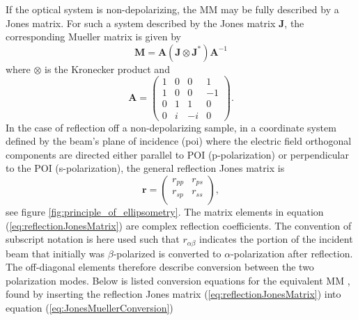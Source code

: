 If the optical system is non-depolarizing, the MM may be fully described by a Jones matrix. For such a system described by the Jones matrix $\mathbf{J}$, the corresponding Mueller matrix is given by \cite{hans_arwin}
\begin{equation}
    \mathbf{M} = \mathbf{A}(\mathbf{J}\otimes\mathbf{J}^*)\mathbf{A}^{-1}
    \label{eq:JonesMuellerConversion}
\end{equation}
where $\otimes$ is the Kronecker product and 
\begin{equation}
    \mathbf{A} = 
    \begin{pmatrix}
        1 & 0 & 0 & 1 \\
        1 & 0 & 0 & -1 \\
        0 & 1 & 1 & 0 \\
        0 & i & -i & 0
    \end{pmatrix}.
\end{equation}
In the case of reflection off a non-depolarizing sample, in a coordinate system defined by the beam's plane of incidence (\ac{poi}) where the electric field orthogonal components are directed either parallel to POI (p-polarization) or perpendicular to the POI (s-polarization), the general reflection Jones matrix is
\begin{equation}
    \mathbf{r} = 
    \begin{pmatrix}
        r_{pp}  &   r_{ps}  \\
        r_{sp}  &   r_{ss}  \\
    \end{pmatrix},
    \label{eq:reflectionJonesMatrix}
\end{equation}
see figure \ref{fig:principle_of_ellipsometry}. The matrix elements in equation (\ref{eq:reflectionJonesMatrix}) are complex reflection coefficients. The convention of subscript notation is here used such that $r_{\alpha\beta}$ indicates the portion of the incident beam that initially was $\beta$-polarized is converted to $\alpha$-polarization after reflection. The off-diagonal elements therefore describe conversion between the two polarization modes. Below is listed conversion equations for the equivalent MM \cite{hauge}, found by inserting the reflection Jones matrix (\ref{eq:reflectionJonesMatrix}) into equation (\ref{eq:JonesMuellerConversion})
